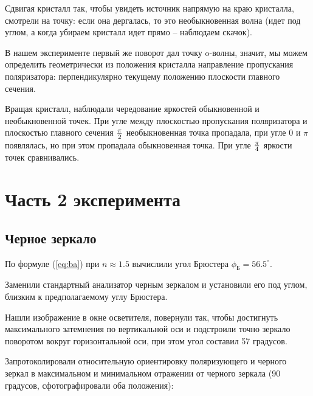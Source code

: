 Сдвигая кристалл так, чтобы увидеть источник напрямую на краю кристалла, смотрели на точку: если она дергалась, то это необыкновенная волна (идет под углом, а когда убираем кристалл идет прямо -- наблюдаем скачок).

В нашем эксперименте первый же поворот дал точку o-волны, значит, мы можем определить геометрически из положения кристалла направление пропускания поляризатора: перпендикулярно текущему положению плоскости главного сечения.

Вращая кристалл, наблюдали чередование яркостей обыкновенной и необыкновенной точек. При угле между плоскостью пропускания поляризатора и плоскостью главного сечения $\pi\over2$ необыкновенная точка пропадала, при угле 0 и $\pi$ появлялась, но при этом пропадала обыкновенная точка. При угле $\pi\over4$ яркости точек сравнивались.



\section{Часть 2 эксперимента}
\subsection{Черное зеркало}

По формуле (\ref{eq:ba}) при $n\approx1.5$ вычислили угол Брюстера $\phi_{\text{Б}}=56.5^{\circ}$. 

Заменили стандартный анализатор черным зеркалом и установили его под углом, близким к предполагаемому углу Брюстера. 

Нашли изображение в окне осветителя, повернули так, чтобы достигнуть максимального затемнения по вертикальной оси и подстроили точно зеркало поворотом вокруг горизонтальной оси, при этом угол составил 57 градусов.

Запротоколировали относительную ориентировку поляризующего и черного зеркал в максимальном и минимальном отражении от черного зеркала (90 градусов, сфотографировали оба положения):


